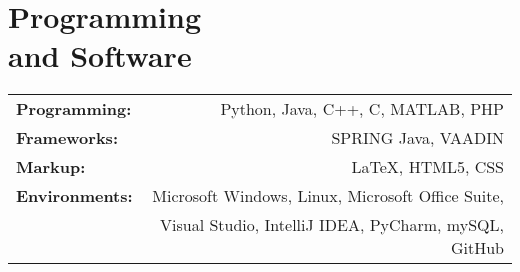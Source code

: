 \section{\sc Programming\\ and Software}
\begin{tabular}{lr}
	\textbf{Programming:} & Python, Java, C++, C, MATLAB, PHP\\
	\textbf{Frameworks:} & SPRING Java, VAADIN\\
	\textbf{Markup:} & \LaTeX, HTML5, CSS\\
	\textbf{Environments:} & Microsoft Windows, Linux, Microsoft Office Suite,\\
	& Visual Studio, IntelliJ IDEA, PyCharm, mySQL, GitHub
\end{tabular}